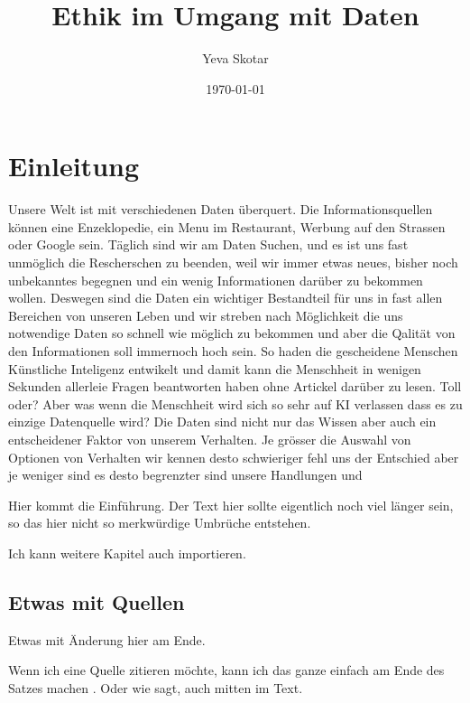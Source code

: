 \documentclass{report}
\title{Ethik im Umgang mit Daten}
\author{Yeva Skotar}
\date{\today}
\begin{document}
\maketitle


\tableofcontents

\chapter{Einleitung}
Unsere Welt ist mit verschiedenen Daten überquert. Die Informationsquellen können eine Enzeklopedie, ein Menu im Restaurant, Werbung auf den Strassen oder Google sein.
Täglich sind wir am Daten Suchen, und es ist uns fast unmöglich die Rescherschen zu beenden, weil wir immer etwas neues, bisher noch unbekanntes 
begegnen und ein wenig Informationen darüber zu bekommen wollen.
Deswegen sind die Daten ein wichtiger Bestandteil für uns in fast allen Bereichen von unseren Leben 
und wir streben nach Möglichkeit die uns notwendige Daten so schnell wie möglich zu bekommen 
und aber die Qalität von den Informationen soll immernoch hoch sein. So haden die gescheidene Menschen Künstliche Inteligenz
entwikelt und damit kann die Menschheit in wenigen Sekunden allerleie Fragen beantworten haben ohne Artickel darüber zu lesen.
Toll oder? Aber was wenn die Menschheit wird sich so sehr auf KI verlassen 
dass es zu einzige Datenquelle wird? Die Daten sind nicht nur das Wissen aber auch ein entscheidener Faktor von unserem Verhalten.
Je grösser die Auswahl von Optionen von Verhalten wir kennen desto schwieriger fehl uns der Entschied aber je weniger sind es desto begrenzter sind unsere Handlungen 
und 

Hier kommt die Einführung. Der Text hier sollte eigentlich noch viel länger sein, so das hier nicht so merkwürdige Umbrüche entstehen.

Ich kann weitere Kapitel auch importieren.



\section{Etwas mit Quellen}

Etwas mit Änderung hier am Ende.

Wenn ich eine Quelle zitieren möchte, kann ich das ganze einfach am Ende des Satzes machen \citep{example}. Oder wie \citet{example} sagt, auch mitten im Text.

\printbibliography
\end{document}
